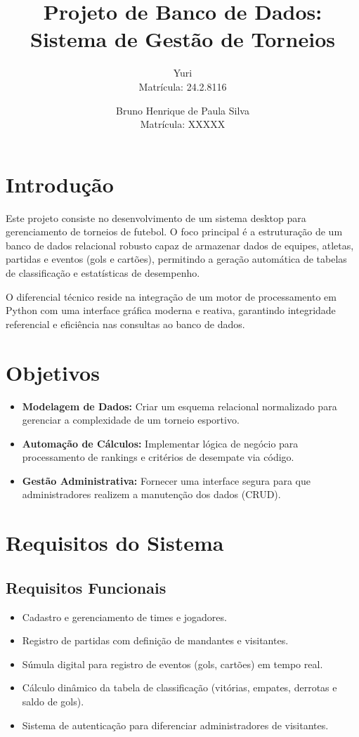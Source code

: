 \documentclass[a4paper,12pt]{article}
\title{Projeto de Banco de Dados: Sistema de Gestão de Torneios}
\author{
Yuri \\ Matrícula: 24.2.8116
\and
Bruno Henrique de Paula Silva \\ Matrícula: XXXXX
}
\begin{document}
\maketitle

\tableofcontents
\newpage

\section{Introdução}
Este projeto consiste no desenvolvimento de um sistema desktop para gerenciamento de torneios de futebol. O foco principal é a estruturação de um banco de dados relacional robusto capaz de armazenar dados de equipes, atletas, partidas e eventos (gols e cartões), permitindo a geração automática de tabelas de classificação e estatísticas de desempenho.

O diferencial técnico reside na integração de um motor de processamento em Python com uma interface gráfica moderna e reativa, garantindo integridade referencial e eficiência nas consultas ao banco de dados.

\section{Objetivos}
\begin{itemize}
    \item \textbf{Modelagem de Dados:} Criar um esquema relacional normalizado para gerenciar a complexidade de um torneio esportivo.
    \item \textbf{Automação de Cálculos:} Implementar lógica de negócio para processamento de rankings e critérios de desempate via código.
    \item \textbf{Gestão Administrativa:} Fornecer uma interface segura para que administradores realizem a manutenção dos dados (CRUD).
\end{itemize}

\section{Requisitos do Sistema}

\subsection{Requisitos Funcionais}
\begin{itemize}
    \item Cadastro e gerenciamento de times e jogadores.
    \item Registro de partidas com definição de mandantes e visitantes.
    \item Súmula digital para registro de eventos (gols, cartões) em tempo real.
    \item Cálculo dinâmico da tabela de classificação (vitórias, empates, derrotas e saldo de gols).
    \item Sistema de autenticação para diferenciar administradores de visitantes.
\end{itemize}
\end{document}
